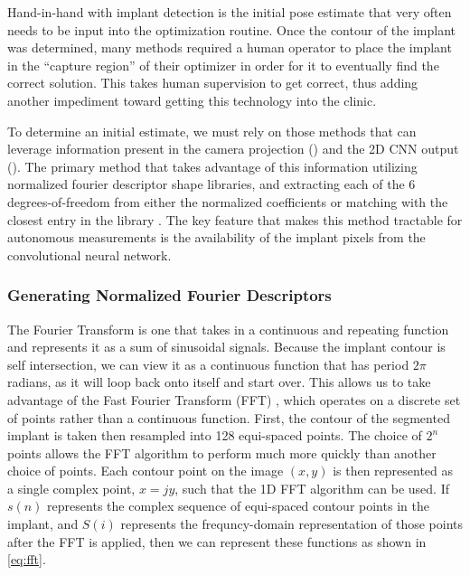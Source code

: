 Hand-in-hand with implant detection is the initial pose estimate that very often needs to be input into the optimization routine. Once the contour of the implant was determined, many methods required a human operator to place the implant in the ``capture region'' of their optimizer in order for it to eventually find the correct solution. This takes human supervision to get correct, thus adding another impediment toward getting this technology into the clinic.

To determine an initial estimate, we must rely on those methods that can leverage information present in the camera projection () and the 2D CNN output (). The primary method that takes advantage of this information utilizing normalized fourier descriptor shape libraries, and extracting each of the 6 degrees-of-freedom from either the normalized coefficients or matching with the closest entry in the library \cite{wallaceAnalysisThreedimensionalMovement1980,wallaceEfficientThreedimensionalAircraft1980,banksModelBased3D1992,banksAccurateMeasurementThreedimensional1996}. The key feature that makes this method tractable for autonomous measurements is the availability of the implant pixels from the convolutional neural network.

\subsubsection{Generating Normalized Fourier Descriptors}
\label{sec:nfd}
The Fourier Transform is one that takes in a continuous and repeating function and represents it as a sum of sinusoidal signals. Because the implant contour is self intersection, we can view it as a continuous function that has period $2\pi$ radians, as it will loop back onto itself and start over. This allows us to take advantage of the Fast Fourier Transform (FFT) \cite{cochranWhatFastFourier1967}, which operates on a discrete set of points rather than a continuous function. First, the contour of the segmented implant is taken then resampled into 128 equi-spaced points. The choice of $2^n$ points allows the FFT algorithm to perform much more quickly than another choice of points. Each contour point on the image $(x, y)$ is then represented as a single complex point, $x = jy$, such that the 1D FFT algorithm can be used. If $s(n)$ represents the complex sequence of equi-spaced contour points in the implant, and $S(i)$ represents the frequncy-domain representation of those points after the FFT is applied, then we can represent these functions as shown in \cref{eq:fft}.


